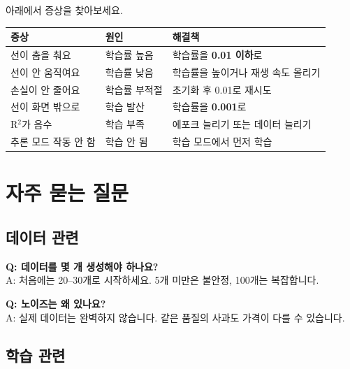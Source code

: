\documentclass[11pt, a4paper]{article}
\begin{document}
\begin{warningbox}
아래에서 증상을 찾아보세요.
\end{warningbox}

\vspace{0.3cm}

\begin{center}
\begin{tabular}{llp{5cm}}
    \toprule
    \textbf{증상} & \textbf{원인} & \textbf{해결책} \\
    \midrule
    선이 춤을 춰요 & 학습률 높음 & 학습률을 \textbf{0.01 이하}로 \\
    선이 안 움직여요 & 학습률 낮음 & 학습률을 높이거나 재생 속도 올리기 \\
    손실이 안 줄어요 & 학습률 부적절 & 초기화 후 0.01로 재시도 \\
    선이 화면 밖으로 & 학습 발산 & 학습률을 \textbf{0.001}로 \\
    R$^2$가 음수 & 학습 부족 & 에포크 늘리기 또는 데이터 늘리기 \\
    추론 모드 작동 안 함 & 학습 안 됨 & 학습 모드에서 먼저 학습 \\
    \bottomrule
\end{tabular}
\end{center}

\section{자주 묻는 질문}

\subsection{데이터 관련}

\textbf{Q: 데이터를 몇 개 생성해야 하나요?}\\
A: 처음에는 20--30개로 시작하세요. 5개 미만은 불안정, 100개는 복잡합니다.

\vspace{0.3cm}

\textbf{Q: 노이즈는 왜 있나요?}\\
A: 실제 데이터는 완벽하지 않습니다. 같은 품질의 사과도 가격이 다를 수 있습니다.

\subsection{학습 관련}
\end{document}
